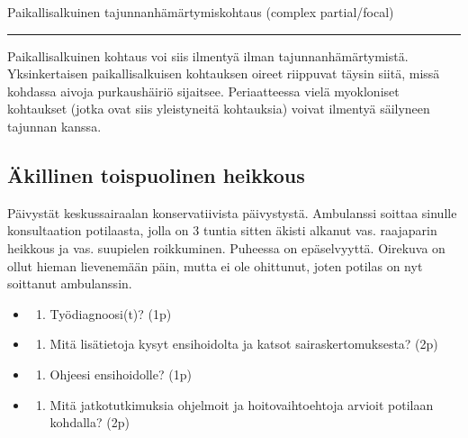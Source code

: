 \documentclass[
]{book}
\providecommand{\tightlist}{%
  \setlength{\itemsep}{0pt}\setlength{\parskip}{0pt}}
\begin{document}
Paikallisalkuinen tajunnanhämärtymiskohtaus (complex partial/focal)

\begin{center}\rule{0.5\linewidth}{0.5pt}\end{center}

Paikallisalkuinen kohtaus voi siis ilmentyä ilman tajunnanhämärtymistä. Yksinkertaisen paikallisalkuisen kohtauksen oireet riippuvat täysin siitä, missä kohdassa aivoja purkaushäiriö sijaitsee. Periaatteessa vielä myokloniset kohtaukset (jotka ovat siis yleistyneitä kohtauksia) voivat ilmentyä säilyneen tajunnan kanssa.

\subsection{Äkillinen toispuolinen heikkous}\label{uxe4killinen-toispuolinen-heikkous}

Päivystät keskussairaalan konservatiivista päivystystä. Ambulanssi soittaa sinulle konsultaation potilaasta, jolla on 3 tuntia sitten äkisti alkanut vas. raajaparin heikkous ja vas. suupielen roikkuminen. Puheessa on epäselvyyttä. Oirekuva on ollut hieman lievenemään päin, mutta ei ole ohittunut, joten potilas on nyt soittanut ambulanssin.

\begin{itemize}
\tightlist
\item
  \begin{enumerate}
  \def\labelenumi{\alph{enumi}.}
  \tightlist
  \item
    Työdiagnoosi(t)? (1p)
  \end{enumerate}
\item
  \begin{enumerate}
  \def\labelenumi{\alph{enumi}.}
  \setcounter{enumi}{1}
  \tightlist
  \item
    Mitä lisätietoja kysyt ensihoidolta ja katsot sairaskertomuksesta? (2p)
  \end{enumerate}
\item
  \begin{enumerate}
  \def\labelenumi{\alph{enumi}.}
  \setcounter{enumi}{2}
  \tightlist
  \item
    Ohjeesi ensihoidolle? (1p)
  \end{enumerate}
\item
  \begin{enumerate}
  \def\labelenumi{\alph{enumi}.}
  \setcounter{enumi}{3}
  \tightlist
  \item
    Mitä jatkotutkimuksia ohjelmoit ja hoitovaihtoehtoja arvioit potilaan kohdalla? (2p)
  \end{enumerate}
\end{itemize}
\end{document}
